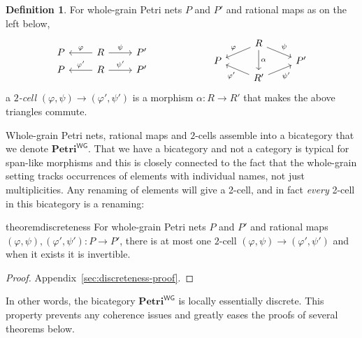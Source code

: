 \documentclass[11pt,a4paper]{article}
\theoremstyle{plain}
\theoremstyle{definition}
\newtheorem{definition}[theorem]{Definition}
\theoremstyle{remark}
\newcommand{\WGPetri}{\mathbf{Petri}^{\mathsf{WG}}}
\begin{document}
\begin{definition}
  For whole-grain Petri nets $P$ and $P'$ and rational maps as on the left below,
\[\begin{tikzcd}[row sep=0.3em]
	P & R & {P'} \\
	P & R & {P'}
	\arrow["\varphi"', from=1-2, to=1-1]
	\arrow["\psi", from=1-2, to=1-3]
	\arrow["{\varphi'}"', from=2-2, to=2-1]
	\arrow["{\psi'}", from=2-2, to=2-3]
\end{tikzcd}\qquad\qquad \qquad 
    \begin{tikzcd}[row sep=0.3em]
	& {R} \\
	P && {P'} \\
	& R'
	\arrow["\varphi"', from=1-2, to=2-1]
	\arrow["\psi", from=1-2, to=2-3]
	\arrow["\alpha", from=1-2, to=3-2]
	\arrow["{\varphi'}", from=3-2, to=2-1]
	\arrow["{\psi'}"', from=3-2, to=2-3]
\end{tikzcd}\]
  a \emph{$2$-cell} $(\varphi, \psi) \to (\varphi', \psi')$ is a morphism $\alpha : R \rightarrow R'$ that makes the above triangles commute.
  \end{definition}
  Whole-grain Petri nets, rational maps and $2$-cells assemble into a
  bicategory that we denote $\WGPetri$. That we have a bicategory and not a
  category is typical for span-like morphisms and this is closely connected to
  the fact that the whole-grain setting tracks occurrences of elements with
  individual names, not just multiplicities. Any renaming of elements will give
  a 2-cell, and in fact \emph{every} 2-cell in this bicategory is a renaming:

\begin{restatable}[Discreteness]{theorem}{discreteness}
\label{thm:discreteness}
  For whole-grain Petri nets $P$ and $P'$ and rational maps
  $(\varphi, \psi), (\varphi', \psi') : P \rightarrow P'$, there is at most one
  $2$-cell $(\varphi, \psi) \rightarrow (\varphi', \psi')$ and when it exists it is invertible.
\end{restatable}
\begin{proof}
Appendix~\ref{sec:discreteness-proof}.
\end{proof}

In other words, the bicategory $\WGPetri$ is locally essentially discrete. This property
prevents any coherence issues and greatly eases the proofs of several theorems
below.
\end{document}
